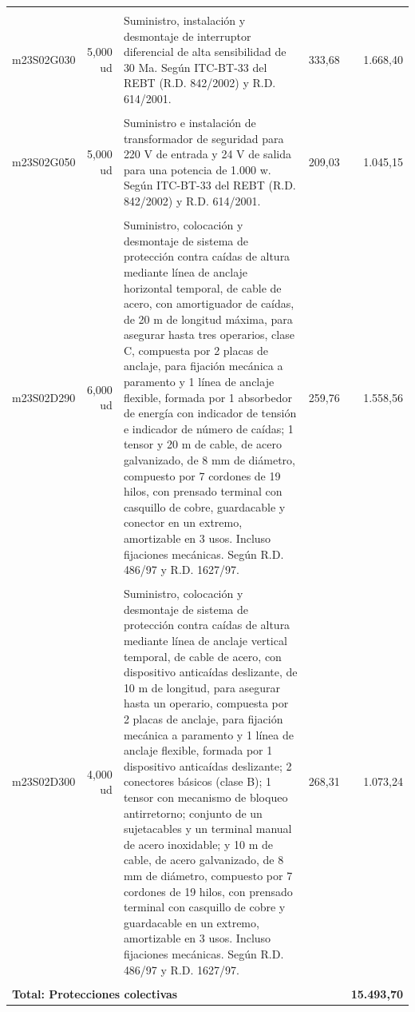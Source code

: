 \documentclass{book}%
\begin{document}
\begin{longtable}{lrlrr}
&&&&\\%
m23S02G030&     5,000 ud&\multicolumn{1}{p{5cm}}{Suministro, instalación y desmontaje de interruptor diferencial de alta sensibilidad de 30 Ma. Según ITC{-}BT{-}33 del REBT (R.D. 842/2002) y R.D. 614/2001.}&    333,68&1.668,40\\%
&&&&\\%
m23S02G050&     5,000 ud&\multicolumn{1}{p{5cm}}{Suministro e instalación de transformador de seguridad para 220 V de entrada y 24 V de salida para una potencia de 1.000 w. Según ITC{-}BT{-}33 del REBT (R.D. 842/2002) y R.D. 614/2001.}&    209,03&1.045,15\\%
&&&&\\%
m23S02D290&     6,000 ud&\multicolumn{1}{p{5cm}}{Suministro, colocación y desmontaje de sistema de protección contra caídas de altura mediante línea de anclaje horizontal temporal, de cable de acero, con amortiguador de caídas, de 20 m de longitud máxima, para asegurar hasta tres operarios, clase C, compuesta por 2 placas de anclaje, para fijación mecánica a paramento y 1 línea de anclaje flexible, formada por 1 absorbedor de energía con indicador de tensión e indicador de número de caídas; 1 tensor y 20 m de cable, de acero galvanizado, de 8 mm de diámetro, compuesto por 7 cordones de 19 hilos, con prensado terminal con casquillo de cobre, guardacable y conector en un extremo, amortizable en 3 usos. Incluso fijaciones mecánicas. Según R.D. 486/97 y R.D. 1627/97.}&    259,76&1.558,56\\%
&&&&\\%
m23S02D300&     4,000 ud&\multicolumn{1}{p{5cm}}{Suministro, colocación y desmontaje de sistema de protección contra caídas de altura mediante línea de anclaje vertical temporal, de cable de acero, con dispositivo anticaídas deslizante, de 10 m de longitud, para asegurar hasta un operario, compuesta por 2 placas de anclaje, para fijación mecánica a paramento y 1 línea de anclaje flexible, formada por 1 dispositivo anticaídas deslizante; 2 conectores básicos (clase B); 1 tensor con mecanismo de bloqueo antirretorno; conjunto de un sujetacables y un terminal manual de acero inoxidable; y 10 m de cable, de acero galvanizado, de 8 mm de diámetro, compuesto por 7 cordones de 19 hilos, con prensado terminal con casquillo de cobre y guardacable en un extremo, amortizable en 3 usos. Incluso fijaciones mecánicas. Según R.D. 486/97 y R.D. 1627/97.}&    268,31&1.073,24\\%
&&&&\\%
\multicolumn{4}{p{8cm}}{\textbf{Total: Protecciones colectivas}}&\textbf{15.493,70}\\%
\end{longtable}%
\normalsize
\end{document}

